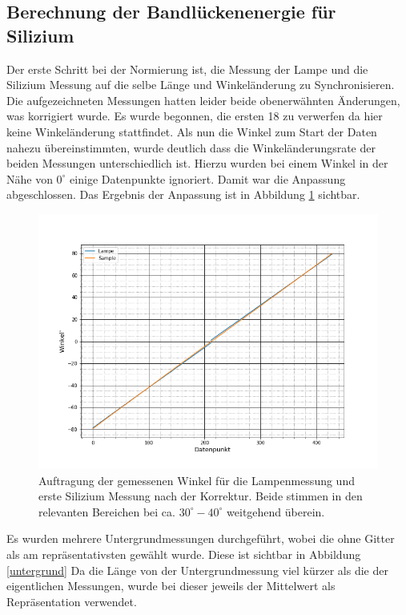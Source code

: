 \subsection{Berechnung der Bandlückenenergie für Silizium}
Der erste Schritt bei der Normierung ist, die Messung der Lampe und die Silizium Messung auf die selbe Länge und Winkeländerung zu Synchronisieren. Die aufgezeichneten Messungen hatten leider beide obenerwähnten Änderungen, was korrigiert wurde. Es wurde begonnen, die ersten 18 zu verwerfen da hier keine Winkeländerung stattfindet. Als nun die Winkel zum Start der Daten nahezu übereinstimmten, wurde deutlich dass die Winkeländerungsrate der beiden Messungen unterschiedlich ist. Hierzu wurden bei einem Winkel in der Nähe von $0^{\circ}$ einige Datenpunkte ignoriert. Damit war die Anpassung abgeschlossen. Das Ergebnis der Anpassung ist in Abbildung \ref{anpassung_si_1} sichtbar. 

\begin{figure}[h]
	\centering
	\label{anpassung_si_1}
	\includegraphics[scale=0.5]{Bilder/korrektur_channels}
	\caption[Korrigierter Lampendatensatz]{\small Auftragung der gemessenen Winkel für die Lampenmessung und erste Silizium Messung nach der Korrektur. Beide stimmen in den relevanten Bereichen bei ca. $30^{\circ}-40^{\circ}$ weitgehend überein.}
\end{figure}

Es wurden mehrere Untergrundmessungen durchgeführt, wobei die ohne Gitter als am repräsentativsten gewählt wurde. Diese ist sichtbar in Abbildung \ref{untergrund} Da die Länge von der Untergrundmessung viel kürzer als die der eigentlichen Messungen, wurde bei dieser jeweils der Mittelwert als Repräsentation verwendet. 


